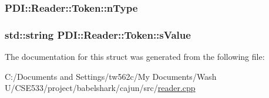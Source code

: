 \hypertarget{struct_p_d_i_1_1_reader_1_1_token_b40312c21bb6b1efbe14eadf7429506a}{
\subsubsection[{nType}]{ {\bf PDI::Reader::Token::nType}}}
\label{struct_p_d_i_1_1_reader_1_1_token_b40312c21bb6b1efbe14eadf7429506a}


\hypertarget{struct_p_d_i_1_1_reader_1_1_token_d64a746e8931b0c31539435df202f1f1}{
\subsubsection[{sValue}]{\setlength{\rightskip}{0pt plus 5cm}std::string {\bf PDI::Reader::Token::sValue}}}
\label{struct_p_d_i_1_1_reader_1_1_token_d64a746e8931b0c31539435df202f1f1}




The documentation for this struct was generated from the following file:\begin{CompactItemize}
\item 
C:/Documents and Settings/tw562c/My Documents/Wash U/CSE533/project/babelshark/cajun/src/\hyperlink{reader_8cpp}{reader.cpp}\end{CompactItemize}
